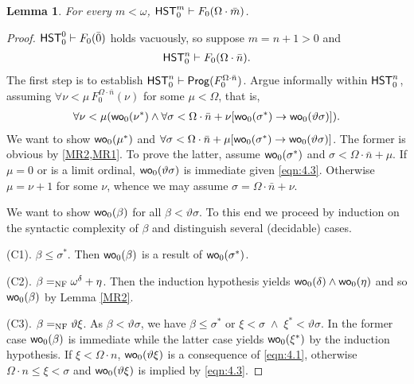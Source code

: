 \documentclass[UKenglish,cleveref,DIV=12]{scrartcl}
\newtheorem{lemma}[theorem]{Lemma}%
\theoremstyle{definition}
\theoremstyle{definition}
\begin{document}
\begin{lemma}\label{prop:F0wellordering}
  For every $m<\omega$, $\mathsf{HST}_0^m\vdash F_0(\Omega\cdot\bar{m})$.
\end{lemma}
\begin{proof}
$\mathsf{HST}_0^0\vdash F_0(\bar0)$ holds vacuously, so suppose $m=n+1>0$ and
\begin{align}\label{eqn:4.1}
\mathsf{HST}_0^n\vdash F_0(\Omega\cdot\bar n).
\end{align}
The first step is to establish
  $\mathsf{HST}_0^n\vdash\mathsf{Prog} (F^{\Omega\cdot\bar n}_0)$.
Argue informally within $\mathsf{HST}_0^n$, assuming $\forall\nu<\mu\, F_0^{\Omega\cdot\bar n}(\nu)$ for some $\mu<\Omega$, that is,
\begin{gather}\label{eqn:4.3}
  \forall\nu<\mu(\mathsf{wo}_0(\nu^*)\land\forall\sigma<\Omega\cdot\bar n+\nu[\mathsf{wo}_0(\sigma^*)\rightarrow\mathsf{wo}_0(\vartheta\sigma)]).
\end{gather}
We want to show $\mathsf{wo}_0(\mu^*)$ and $\forall\sigma<\Omega\cdot\bar n+\mu[\mathsf{wo}_0(\sigma^*)\rightarrow\mathsf{wo}_0(\vartheta\sigma)]$. The former is obvious 
by \cref{MR2,MR1}.
To prove the latter,
assume $\mathsf{wo}_0(\sigma^*)$ and $\sigma<\Omega\cdot\bar n+\mu$. If $\mu=0$ or is
a limit ordinal, $\mathsf{wo}_0(\vartheta\sigma)$ is immediate given \eqref{eqn:4.3}. Otherwise $\mu=\nu+1$
for some $\nu$, whence we may assume $\sigma=\Omega\cdot\bar n+\nu$. 

We want to show $\mathsf{wo}_0(\beta)$ for all $\beta< \vartheta \sigma$. To this end we proceed by induction on the syntactic complexity of $\beta$ and distinguish several (decidable) cases.

(C1). $\beta\le\sigma^*$. Then $\mathsf{wo}_0(\beta)$ is a result of $\mathsf{wo}_0(\sigma^*)$.

(C2). $\beta=_{\mathrm{NF}}\omega^\delta+\eta$. Then the induction hypothesis yields
$\mathsf{wo}_0(\delta)\land\mathsf{wo}_0(\eta)$ and so $\mathsf{wo}_0(\beta)$ by Lemma \ref{MR2}.

(C3). $\beta=_{\mathrm{NF}}\vartheta\xi$. As $\beta< \vartheta \sigma$, we have $\beta\leq \sigma^*$ or $\xi < \sigma\;\wedge\;\xi^*<\vartheta \sigma$.
In the former case $\mathsf{wo}_0(\beta)$ is immediate while the latter case yields $\mathsf{wo}_0(\xi^*)$ by the induction hypothesis.
 If $\xi<\Omega\cdot n$, $\mathsf{wo}_0(\vartheta\xi)$ is a
consequence of \eqref{eqn:4.1}, otherwise $\Omega\cdot n\le\xi<\sigma$ and
$\mathsf{wo}_0(\vartheta\xi)$ is implied by \eqref{eqn:4.3}.







\end{proof}
\end{document}
